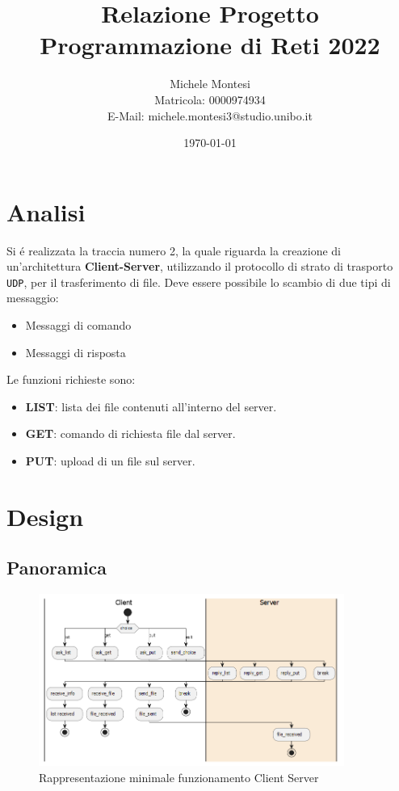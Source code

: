 \documentclass[a4paper, 12pt]{report}
\title{Relazione Progetto Programmazione di Reti 2022}
\author{Michele Montesi \\
        Matricola: 0000974934 \\
        E-Mail: michele.montesi3@studio.unibo.it}
\date{\today}
\begin{document}
\maketitle
\tableofcontents

\chapter{Analisi}
Si é realizzata la traccia numero 2, la quale riguarda la creazione di un'architettura
\textbf{Client-Server}, utilizzando il protocollo di strato di trasporto \texttt{UDP}, per il trasferimento
di file.
Deve essere possibile lo scambio di due tipi di messaggio:
\begin{itemize}
    \item Messaggi di comando
    \item Messaggi di risposta
\end{itemize}
Le funzioni richieste sono:
\begin{itemize}
    \item \textbf{LIST}: lista dei file contenuti all'interno del server.
    \item \textbf{GET}: comando di richiesta file dal server.
    \item \textbf{PUT}: upload di un file sul server.
\end{itemize}

\chapter{Design}

\section{Panoramica}

\begin{figure}[H]
    \centering
    \includegraphics[width=10cm]{img/funzionamento.png}
    \caption{Rappresentazione minimale funzionamento Client Server}
\end{figure}
\end{document}
